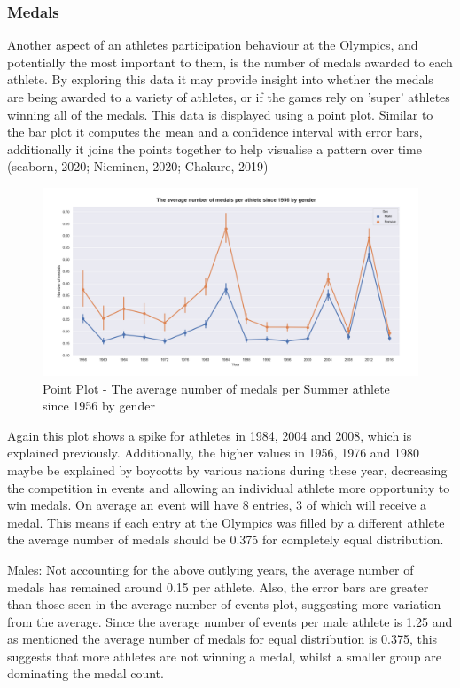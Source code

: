 \documentclass[a4 paper, 12pt]{article}
\begin{document}
        \subsubsection{Medals}
        Another aspect of an athletes participation behaviour at the Olympics, and potentially the most important to them, is the number of medals awarded to each athlete. By exploring this data it may provide insight into whether the medals are being awarded to a variety of athletes, or if the games rely on 'super' athletes winning all of the medals. This data is displayed using a point plot. Similar to the bar plot it computes the mean and a confidence interval with error bars, additionally it joins the points together to help visualise a pattern over time (seaborn, 2020; Nieminen, 2020; Chakure, 2019) 

        \begin{figure} [H]
            \centering
            \includegraphics[width=\textwidth, frame]
                {./images/graph/athlete_medal_pointplot.png}      
                \caption{Point Plot - The average number of medals per Summer athlete since 1956 by gender} 
        \end{figure}
        Again this plot shows a spike for athletes in 1984, 2004 and 2008, which is explained previously. Additionally, the higher values in 1956, 1976 and 1980 maybe be explained by boycotts by various nations during these year, decreasing the competition in events and allowing an individual athlete more opportunity to win medals. On average an event will have 8 entries, 3 of which will receive a medal. This means if each entry at the Olympics was filled by a different athlete the average number of medals should be 0.375 for completely equal distribution.          

        Males: Not accounting for the above outlying years, the average number of medals has remained around 0.15 per athlete. Also, the error bars are greater than those seen in the average number of events plot, suggesting more variation from the average. Since the average number of events per male athlete is 1.25 and as mentioned the average number of medals for equal distribution is 0.375, this suggests that more athletes are not winning a medal, whilst a smaller group are dominating the medal count.
\end{document}
